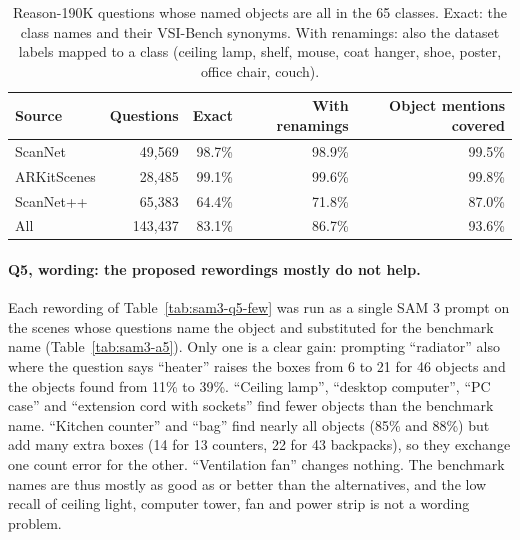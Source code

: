 \begin{table}[t]
\centering
\caption{Reason-190K questions whose named objects are all in the 65 classes. Exact: the class names and their
VSI-Bench synonyms. With renamings: also the dataset labels mapped to a class (ceiling lamp, shelf, mouse,
coat hanger, shoe, poster, office chair, couch).}
\label{tab:sam3-a2}
\begin{tabular}{lrrrr}
\toprule
Source & Questions & Exact & With renamings & Object mentions covered \\
\midrule
ScanNet     &  49,569 & 98.7\% & 98.9\% & 99.5\% \\
ARKitScenes &  28,485 & 99.1\% & 99.6\% & 99.8\% \\
ScanNet++   &  65,383 & 64.4\% & 71.8\% & 87.0\% \\
All         & 143,437 & 83.1\% & 86.7\% & 93.6\% \\
\bottomrule
\end{tabular}
\end{table}

\paragraph{Q5, wording: the proposed rewordings mostly do not help.}
Each rewording of Table~\ref{tab:sam3-q5-few} was run as a single SAM 3 prompt on the scenes whose questions
name the object and substituted for the benchmark name (Table~\ref{tab:sam3-a5}). Only one is a clear gain:
prompting ``radiator'' also where the question says ``heater'' raises the boxes from 6 to 21 for 46 objects and
the objects found from 11\% to 39\%. ``Ceiling lamp'', ``desktop computer'', ``PC case'' and ``extension cord with sockets'' find
fewer objects than the benchmark name. ``Kitchen counter'' and ``bag'' find nearly all objects (85\% and 88\%)
but add many extra boxes (14 for 13 counters, 22 for 43 backpacks), so they exchange one count error for the
other. ``Ventilation fan'' changes nothing. The benchmark names are thus mostly as good as or better than the alternatives, and the low recall of
ceiling light, computer tower, fan and power strip is not a wording problem.

